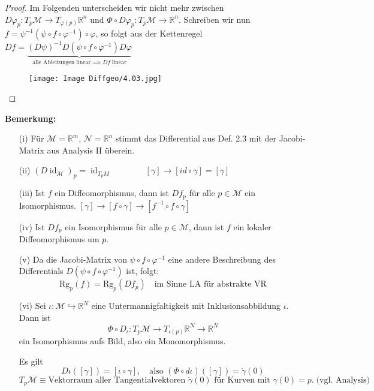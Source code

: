 \documentclass[fleqn, 12pt, letterpaper]{article}
\newcommand{\txt}[1]{\text{#1}}
\begin{document}
\begin{proof}
Im Folgenden unterscheiden wir nicht mehr zwischen \( D\varphi_p: T_p\mathcal{M} \to T_{\varphi(p)} \mathbb{R}^n \) und \( \Phi \circ D\varphi_p: T_p\mathcal{M} \to \mathbb{R}^n \). Schreiben wir nun \( f = \psi^{-1}(\psi \circ f \circ \varphi^{-1}) \circ \varphi\), so folgt aus der Kettenregel \( Df =\underbrace{(D\psi)^{-1}D(\psi \circ f \circ \varphi^{-1})D\varphi}_{\txt{alle Ableitungen linear}\implies Df\;\txt{linear}} \)

\begin{figure}[H]
  \centering
  \texttt{[image: Image Diffgeo/4.03.jpg]}
\end{figure}
\end{proof}

\textbf{Bemerkung:}
\begin{itemize}
    \item[(i)] Für \(\mathcal{M} = \mathbb{R}^m\), \(\mathcal{N} = \mathbb{R}^n\) stimmt das Differential aus Def. 2.3 mit der Jacobi-Matrix aus Analysis II überein.
    
    \item[(ii)] \((D\operatorname{id}_{\mathcal{M}})_p = \operatorname{id}_{T_pM} \qquad \qquad [\gamma]\rightarrow[id\circ\gamma]=[\gamma]\)
    
    \item[(iii)] Ist \( f \) ein Diffeomorphismus, dann ist \( Df_p \) für alle \( p \in \mathcal{M} \) ein Isomorphismus. \([\gamma]\rightarrow[f \circ \gamma]\rightarrow[f^{-1} \circ f \circ \gamma]\)
    
    \item[(iv)] Ist \( Df_p \) ein Isomorphismus für alle \( p \in \mathcal{M} \), dann ist \( f \) ein lokaler Diffeomorphismus um $p$.
    
    \item[(v)] Da die Jacobi-Matrix von \(\psi \circ f \circ \varphi^{-1}\) eine andere Beschreibung des Differentials \( D(\psi \circ f \circ \varphi^{-1}) \) ist, folgt:
    \[
    \txt{Rg}_p(f)=\txt{Rg}_p(Df_p) \quad \txt{im Sinne LA für abstrakte VR}
    \]
    
    \item[(vi)] Sei \(\iota: \mathcal{M} \hookrightarrow \mathbb{R}^N\) eine Untermannigfaltigkeit mit Inklusionsabbildung \(\iota\). Dann ist
    \[
    \Phi\circ D_{\iota} : T_p \mathcal{M} \to T_{\iota(p)} \mathbb{R}^N \to \mathbb{R}^N
    \]
    ein Isomorphismus aufs Bild, also ein Monomorphismus.

    Es gilt
    \[
    D\iota([\gamma]) = [\iota \circ \gamma], \quad \txt{also }(\Phi\circ d\iota)([\gamma]) = \dot{\gamma}(0)
    \]
    \[
    T_p\mathcal{M} \equiv  \text{Vektorraum aller Tangentialvektoren } \dot{\gamma}(0) \text{ für Kurven mit } \gamma(0) = p. \;\txt{(vgl. Analysis)}
    \]
\end{itemize}
\end{document}
